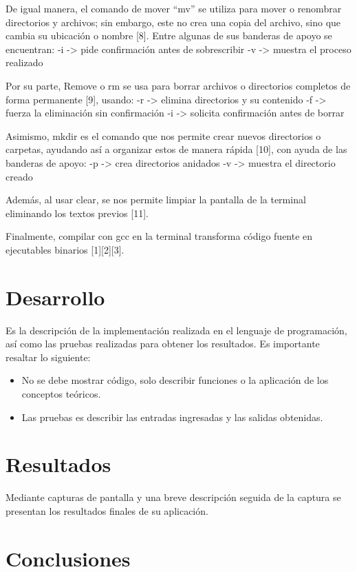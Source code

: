 \documentclass[letterpaper,12pt,oneside]{article}
\begin{document}
De igual manera, el comando de mover “mv” se utiliza para mover o renombrar directorios y archivos; sin embargo, este no crea una copia del archivo, sino que cambia su ubicación o nombre [8]. Entre algunas de sus banderas de apoyo se encuentran:  
-i -> pide confirmación antes de sobrescribir  
-v -> muestra el proceso realizado  

Por su parte, Remove o rm se usa para borrar archivos o directorios completos de forma permanente [9], usando:  
-r -> elimina directorios y su contenido  
-f -> fuerza la eliminación sin confirmación  
-i -> solicita confirmación antes de borrar  

Asimismo, mkdir es el comando que nos permite crear nuevos directorios o carpetas, ayudando así a organizar estos de manera rápida [10], con ayuda de las banderas de apoyo:  
-p -> crea directorios anidados  
-v -> muestra el directorio creado  

Además, al usar clear, se nos permite limpiar la pantalla de la terminal eliminando los textos previos [11].

Finalmente, compilar con gcc en la terminal transforma código fuente en ejecutables binarios [1][2][3].

\section{Desarrollo}

Es la descripción de la implementación realizada en el lenguaje de programación, así como las pruebas realizadas para obtener los resultados. Es importante resaltar lo siguiente:

\begin{itemize}
    \item No se debe mostrar código, solo describir funciones o la aplicación de los conceptos teóricos.
    \item Las pruebas es describir las entradas ingresadas y las salidas obtenidas.
\end{itemize}

\section{Resultados}

Mediante capturas de pantalla y una breve descripción seguida de la captura se presentan los resultados finales de su aplicación.

\section{Conclusiones}
\end{document}
